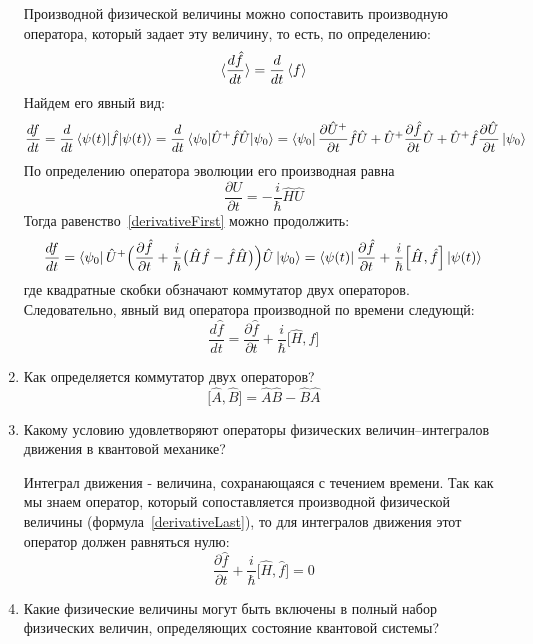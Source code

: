 \documentclass{article}
\begin{document}
\begin{enumerate}
	
	Производной физической величины можно сопоставить производную оператора, который задает эту величину, то есть, по определению:
	\begin{equation}
		\braket{\frac{d\hat{f}}{dt}} = \frac{d}{dt}\braket{f}
	\end{equation}
	Найдем его явный вид:
	\begin{equation}
		\frac{df}{dt} = \frac{d}{dt} \braket{\psi(t) | \hat{f} | \psi(t)} = \frac{d}{dt} \braket{\psi_0 |\hat{U}^+ \hat{f} \hat{U} | \psi_0} = \bra{\psi_0} \frac{\partial \hat{U}^+}{\partial t} \hat{f} \hat{U} + \hat{U}^+\frac{\partial \hat{f}}{\partial t} \hat{U} + \hat{U}^+ \hat{f}\frac{\partial \hat{U}}{\partial t} \ket{\psi_0} \label{derivativeFirst}
	\end{equation}
	По определению оператора эволюции его производная равна
	\begin{equation}
		\frac{\partial U}{\partial t} = -\frac{i}{\hbar} \hat{H} \hat{U}
	\end{equation}
	Тогда равенство~\eqref{derivativeFirst} можно продолжить:
	\begin{equation}
		\frac{df}{dt} = \bra{\psi_0} \hat{U}^+ \Big( \frac{\partial \hat{f}}{\partial t} + \frac{i}{\hbar} \big( \hat{H} \hat{f} - \hat{f} \hat{H} \big) \Big)\hat{U}\ket{\psi_0} = \bra{\psi(t)}\frac{\partial \hat{f}}{\partial t} + \frac{i}{\hbar} \Big[ \hat{H}, \hat{f}\Big] \ket{\psi(t)}
	\end{equation}
	где квадратные скобки обзначают {коммутатор} двух операторов. Следовательно, явный вид оператора производной по времени следующй:
	\begin{equation}
	\frac{d\hat{f}}{dt} = \frac{\partial \hat{f}}{\partial t} + \frac{i}{\hbar} \Big[ \hat{H}, \hat{f}\Big] \label{derivativeLast}
	\end{equation}
	\item {Как определяется коммутатор двух операторов?}
	\begin{equation}
		\Big[ \hat{A}, \hat{B} \Big] = \hat{A} \hat{B} - \hat{B} \hat{A}
	\end{equation}
	\item {
 Какому условию удовлетворяют операторы физических величин–интегралов движения в квантовой механике?	
	}
	
	Интеграл движения - величина, сохранающаяся с течением времени. Так как мы знаем оператор, который сопоставляется производной физической величины (формула~\eqref{derivativeLast}), то для интегралов движения этот оператор должен равняться нулю:
	\begin{equation}
		\frac{\partial \hat{f}}{\partial t} + \frac{i}{\hbar} \Big[ \hat{H}, \hat{f}\Big] = 0
	\end{equation}
	\item {Какие физические величины могут быть включены в полный набор физических величин, определяющих состояние квантовой системы?}
	

\end{enumerate}
\end{document}
